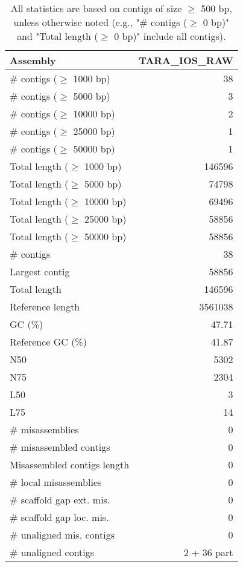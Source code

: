 \documentclass[12pt,a4paper]{article}
\begin{document}
\begin{table}[ht]
\begin{center}
\caption{All statistics are based on contigs of size $\geq$ 500 bp, unless otherwise noted (e.g., "\# contigs ($\geq$ 0 bp)" and "Total length ($\geq$ 0 bp)" include all contigs).}
\begin{tabular}{|l*{1}{|r}|}
\hline
Assembly & TARA\_IOS\_RAW \\ \hline
\# contigs ($\geq$ 1000 bp) & 38 \\ \hline
\# contigs ($\geq$ 5000 bp) & 3 \\ \hline
\# contigs ($\geq$ 10000 bp) & 2 \\ \hline
\# contigs ($\geq$ 25000 bp) & 1 \\ \hline
\# contigs ($\geq$ 50000 bp) & 1 \\ \hline
Total length ($\geq$ 1000 bp) & 146596 \\ \hline
Total length ($\geq$ 5000 bp) & 74798 \\ \hline
Total length ($\geq$ 10000 bp) & 69496 \\ \hline
Total length ($\geq$ 25000 bp) & 58856 \\ \hline
Total length ($\geq$ 50000 bp) & 58856 \\ \hline
\# contigs & 38 \\ \hline
Largest contig & 58856 \\ \hline
Total length & 146596 \\ \hline
Reference length & 3561038 \\ \hline
GC (\%) & 47.71 \\ \hline
Reference GC (\%) & 41.87 \\ \hline
N50 & 5302 \\ \hline
N75 & 2304 \\ \hline
L50 & 3 \\ \hline
L75 & 14 \\ \hline
\# misassemblies & 0 \\ \hline
\# misassembled contigs & 0 \\ \hline
Misassembled contigs length & 0 \\ \hline
\# local misassemblies & 0 \\ \hline
\# scaffold gap ext. mis. & 0 \\ \hline
\# scaffold gap loc. mis. & 0 \\ \hline
\# unaligned mis. contigs & 0 \\ \hline
\# unaligned contigs & 2 + 36 part \\ \hline

\end{tabular}
\end{center}
\end{table}
\end{document}
